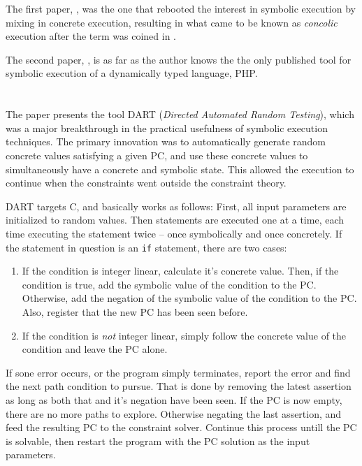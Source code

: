 \documentclass[11pt]{report}
\begin{document}
\begin{description}
The first paper, \cite{DART}, was the one that rebooted the interest
in symbolic execution by mixing in concrete execution, resulting in
what came to be known as {\it concolic} execution after the term was
coined in \cite{CUTE}.

The second paper, \cite{Apollo}, is as far as the author knows the the
only published tool for symbolic execution of a dynamically typed
language, PHP.

\section{\citet{DART}}

The paper presents the tool DART ({\it Directed Automated Random
  Testing}), which was a major breakthrough in the practical
usefulness of symbolic execution techniques. The primary innovation
was to automatically generate random concrete values satisfying a
given PC, and use these concrete values to simultaneously have a
concrete and symbolic state. This allowed the execution to continue
when the constraints went outside the constraint theory.

DART targets C, and basically works as follows: First, all input
parameters are initialized to random values. Then statements are
executed one at a time, each time executing the statement twice --
once symbolically and once concretely. If the statement in question is
an \verb|if| statement, there are two cases:
\begin{enumerate}
  \item If the condition is integer linear, calculate it's concrete
    value. Then, if the condition is true, add the symbolic value of
    the condition to the PC. Otherwise, add the negation of the
    symbolic value of the condition to the PC. Also, register that the
    new PC has been seen before.
  \item If the condition is {\it not} integer linear, simply follow
    the concrete value of the condition and leave the PC alone.
\end{enumerate}
If sone error occurs, or the program simply terminates, report the
error and find the next path condition to pursue. That is done by
removing the latest assertion as long as both that and it's negation
have been seen. If the PC is now empty, there are no more paths to
explore. Otherwise negating the last assertion, and feed the resulting
PC to the constraint solver. Continue this process untill the PC is
solvable, then restart the program with the PC solution as the input
parameters.


\end{description}
\end{document}
